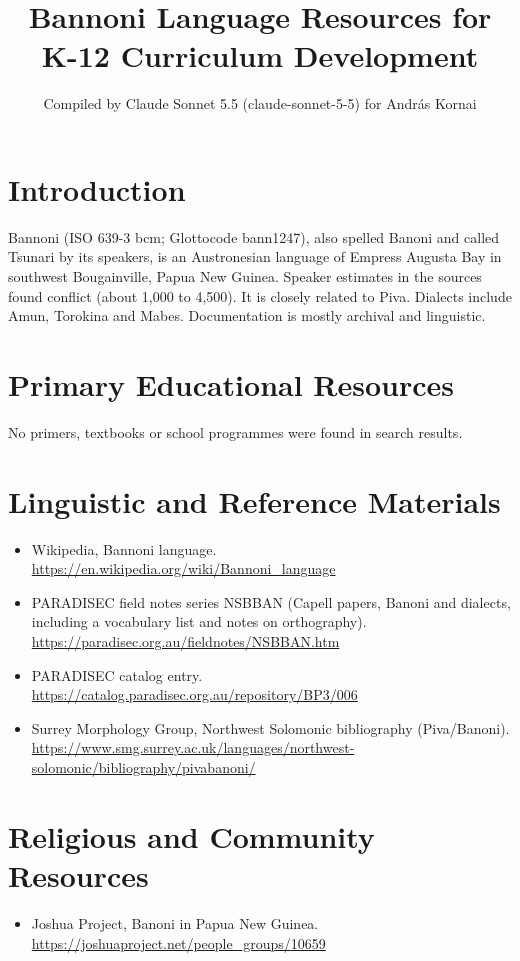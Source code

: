 \documentclass[12pt]{article}
\title{Bannoni Language Resources for K-12 Curriculum Development}
\author{Compiled by Claude Sonnet 5.5 (claude-sonnet-5-5) for Andr\'as Kornai}
\date{}
\begin{document}
\maketitle

\section{Introduction}
Bannoni (ISO 639-3 bcm; Glottocode bann1247), also spelled Banoni and called Tsunari by its speakers, is an Austronesian language of Empress Augusta Bay in southwest Bougainville, Papua New Guinea. Speaker estimates in the sources found conflict (about 1,000 to 4,500). It is closely related to Piva. Dialects include Amun, Torokina and Mabes. Documentation is mostly archival and linguistic.

\section{Primary Educational Resources}
No primers, textbooks or school programmes were found in search results.

\section{Linguistic and Reference Materials}
\begin{itemize}
\item Wikipedia, Bannoni language. \url{https://en.wikipedia.org/wiki/Bannoni_language}
\item PARADISEC field notes series NSBBAN (Capell papers, Banoni and dialects, including a vocabulary list and notes on orthography). \url{https://paradisec.org.au/fieldnotes/NSBBAN.htm}
\item PARADISEC catalog entry. \url{https://catalog.paradisec.org.au/repository/BP3/006}
\item Surrey Morphology Group, Northwest Solomonic bibliography (Piva/Banoni). \url{https://www.smg.surrey.ac.uk/languages/northwest-solomonic/bibliography/pivabanoni/}
\end{itemize}

\section{Religious and Community Resources}
\begin{itemize}
\item Joshua Project, Banoni in Papua New Guinea. \url{https://joshuaproject.net/people_groups/10659}
\end{itemize}
\end{document}
